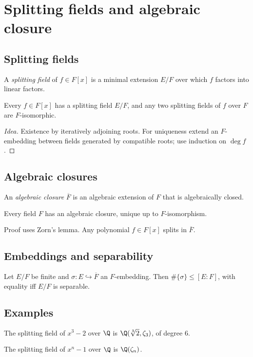 \section{Splitting fields and algebraic closure}\label{sec:splitting-fields}

\subsection{Splitting fields}
\begin{definition}
A \emph{splitting field} of $f\in F[x]$ is a minimal extension $E/F$ over which $f$ factors into linear factors.
\end{definition}
\begin{theorem}
Every $f\in F[x]$ has a splitting field $E/F$, and any two splitting fields of $f$ over $F$ are $F$-isomorphic.
\end{theorem}
\begin{proof}[Idea]
Existence by iteratively adjoining roots. For uniqueness extend an $F$-embedding between fields generated by compatible roots; use induction on $\deg f$.
\end{proof}

\subsection{Algebraic closures}
\begin{definition}
An \emph{algebraic closure} $\overline{F}$ is an algebraic extension of $F$ that is algebraically closed.
\end{definition}
\begin{theorem}
Every field $F$ has an algebraic closure, unique up to $F$-isomorphism.
\end{theorem}
\begin{remark}
Proof uses Zorn's lemma. Any polynomial $f\in F[x]$ splits in $\overline{F}$.
\end{remark}

\subsection{Embeddings and separability}
\begin{proposition}
Let $E/F$ be finite and $\sigma:E\hookrightarrow \overline{F}$ an $F$-embedding. Then $\#\{\sigma\}\le [E\!:\!F]$, with equality iff $E/F$ is separable.
\end{proposition}

\subsection{Examples}
\begin{example}[Cubic]
The splitting field of $x^3-2$ over $\Q$ is $\Q(\root 3\of 2,\zeta_3)$, of degree $6$.
\end{example}
\begin{example}[Cyclotomic]
The splitting field of $x^n-1$ over $\Q$ is $\Q(\zeta_n)$.
\end{example}
